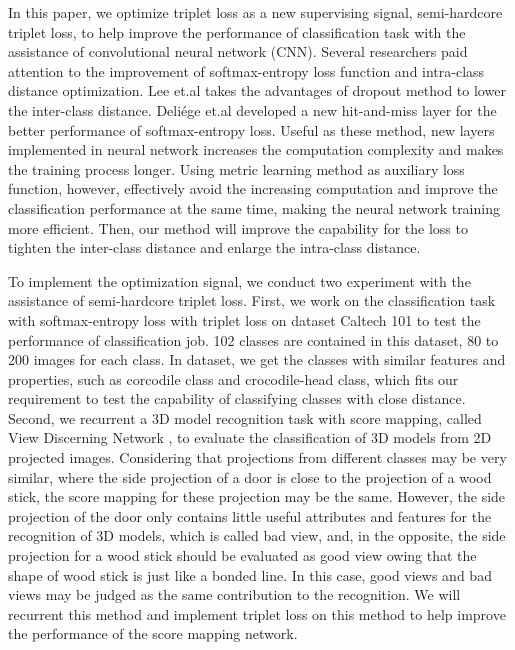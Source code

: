 \documentclass[11pt,onecolumn,letterpaper]{article}
\begin{document}
In this paper, we optimize triplet loss as a new supervising signal, semi-hardcore triplet loss, to help improve the performance of classification task with the assistance of convolutional neural network (CNN). Several researchers paid attention to the improvement of softmax-entropy loss function and intra-class distance optimization. Lee et.al \cite{lee2018dropmax} takes the advantages of dropout method to lower the inter-class distance. Deli{\'e}ge et.al \cite{deliege2018hitnet} developed a new hit-and-miss layer for the better performance of softmax-entropy loss. Useful as these method, new layers implemented in neural network increases the computation complexity and makes the training process longer. Using metric learning method as auxiliary loss function, however, effectively avoid the increasing computation and improve the classification performance at the same time, making the neural network training more efficient. Then, our method will improve the capability for the loss to tighten the inter-class distance and enlarge the intra-class distance.

To implement the optimization signal, we conduct two experiment with the assistance of semi-hardcore triplet loss. First, we work on the classification task with softmax-entropy loss with triplet loss on dataset Caltech 101\cite{griffin2007caltech} to test the performance of classification job. 102 classes are contained in this dataset, 80 to 200 images for each class. In dataset, we get the classes with similar features and properties, such as corcodile class and crocodile-head class, which fits our requirement to test the capability of classifying classes with close distance. Second, we recurrent a 3D model recognition task with score mapping, called View Discerning Network \cite{leng2018learning}, to evaluate the classification of 3D models from 2D projected images. Considering that projections from different classes may be very similar, where the side projection of a door is close to the projection of a wood stick, the score mapping for these projection may be the same. However, the side projection of the door only contains little useful attributes and features for the recognition of 3D models, which is called bad view, and, in the opposite, the side projection for a wood stick should be evaluated as good view owing that the shape of wood stick is just like a bonded line. In this case, good views and bad views may be judged as the same contribution to the recognition. We will recurrent this method and implement triplet loss on this method to help improve the performance of the score mapping network.
\end{document}
